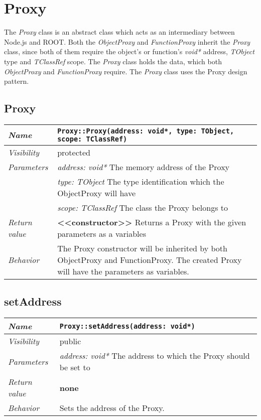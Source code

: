 \chapter{Proxy}
The \textit{Proxy} class is an abstract class which acts as an intermediary between Node.js and ROOT. Both the \textit{ObjectProxy} and \textit{FunctionProxy} inherit the \textit{Proxy} class, since both of them require the object's or function's \textit{void*} address, \textit{TObject} type and \textit{TClassRef} scope. The \textit{Proxy} class holds the data, which both \textit{ObjectProxy} and \textit{FunctionProxy} require. The \textit{Proxy} class uses the Proxy design pattern.
\section{Proxy}
\begin{longtable}{p{3cm} @{\hskip 1cm} p{12cm}}
 \hline
\textit{Name} & \texttt{Proxy::Proxy(address: void*, type: TObject, scope: TClassRef)}\\
\hline
 \textit{Visibility} & protected\\
\hline
\textit{Parameters} & \textit{address: void*} The memory address of the Proxy \\
& \textit{type: TObject}  The type identification which the ObjectProxy will have \\
& \textit{scope: TClassRef} The class the Proxy belongs to \\
\hline
\textit{Return value} & \textbf{<<constructor>>} Returns a Proxy with the given parameters as a variables \\
  \hline
 \textit{Behavior} & The Proxy constructor will be inherited by both ObjectProxy and FunctionProxy.
 The created Proxy will have the parameters as variables. \\
\hline
\end{longtable} \pagebreak
 \section{setAddress}
\begin{longtable}{p{3cm} @{\hskip 1cm} p{12cm}}
 \hline
\textit{Name} & \texttt{Proxy::setAddress(address: void*)}\\
\hline
 \textit{Visibility} & public\\
\hline
\textit{Parameters} & \textit{address: void*} The address to which the Proxy should be set to \\
\hline
\textit{Return value} & \textbf{none}\\
  \hline
 \textit{Behavior} & Sets the address of the Proxy. \\
\hline
\end{longtable} \pagebreak
